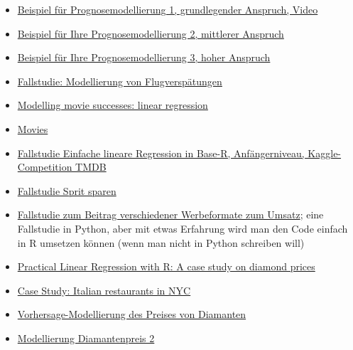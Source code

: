 \documentclass[
  letterpaper,
  DIV=11,
  numbers=noendperiod]{scrreprt}
\theoremstyle{definition}
\theoremstyle{definition}
\theoremstyle{remark}
\begin{document}
\begin{itemize}
\item
  \href{https://youtu.be/5pBTHrnRIZY}{Beispiel für Prognosemodellierung
  1, grundlegender Anspruch, Video}
\item
  \href{https://data-se.netlify.app/2020/11/13/fallstudie-zur-regressionsanalyse-ggplot2movies/}{Beispiel
  für Ihre Prognosemodellierung 2, mittlerer Anspruch}
\item
  \href{https://data-se.netlify.app/2021/03/10/fallstudie-modellierung-von-flugversp\%C3\%A4tungen/}{Beispiel
  für Ihre Prognosemodellierung 3, hoher Anspruch}
\item
  \href{https://data-se.netlify.app/2021/03/10/fallstudie-modellierung-von-flugversp\%C3\%A4tungen/}{Fallstudie:
  Modellierung von Flugverspätungen}
\item
  \href{https://data-se.netlify.app/2021/02/24/modelling-movie-successes-linear-regression/}{Modelling
  movie successes: linear regression}
\item
  \href{https://data-se.netlify.app/2020/11/13/fallstudie-zur-regressionsanalyse-ggplot2movies/}{Movies}
\item
  \href{https://www.kaggle.com/code/ssauer/tmdb-simple-regression-beginners}{Fallstudie
  Einfache lineare Regression in Base-R, Anfängerniveau,
  Kaggle-Competition TMDB}
\item
  \href{https://data-se.netlify.app/2022/05/02/fallstudie-spritverbrauch/}{Fallstudie
  Sprit sparen}
\item
  \href{https://www.kaggle.com/code/saikatkumardey/linear-regression-case-study/notebook}{Fallstudie
  zum Beitrag verschiedener Werbeformate zum Umsatz}; eine Fallstudie in
  Python, aber mit etwas Erfahrung wird man den Code einfach in R
  umsetzen können (wenn man nicht in Python schreiben will)
\item
  \href{https://www.linkedin.com/pulse/practical-linear-regression-r-case-study-diamond-prices-valdeleon/?trk=public_profile_article_view}{Practical
  Linear Regression with R: A case study on diamond prices}
\item
  \href{https://stat-ata-asu.github.io/MultipleAndLogisticRegression/case-study-italian-restaurants-in-nyc.html}{Case
  Study: Italian restaurants in NYC}
\item
  \href{https://data-se.netlify.app/2021/05/19/vohrersgage-modellierung-des-preises-von-diamanten/}{Vorhersage-Modellierung
  des Preises von Diamanten}
\item
  \href{https://data-se.netlify.app/2021/05/25/modellierung-diamantenpreis-2/}{Modellierung
  Diamantenpreis 2}
\end{itemize}
\end{document}

